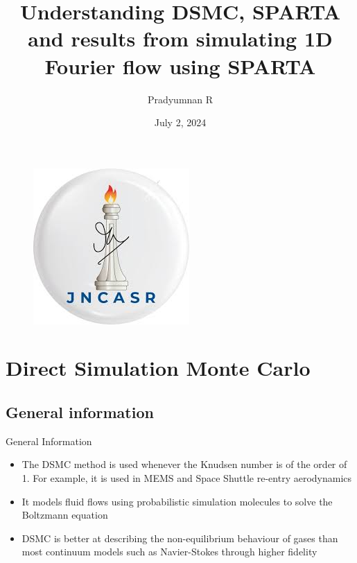 \documentclass{beamer}
\author{Pradyumnan R}
\title{Understanding DSMC, SPARTA and results from simulating 1D Fourier flow using SPARTA}
\institute{JNCASR}
\date{July 2, 2024}
\begin{document}
\renewcommand{\figurename}{Fig.} %

\begin{frame}
    \titlepage
    \begin{figure}[htpb]
        \begin{center}
            \includegraphics[width=0.2\linewidth]{Pictures/JNCASR_Logo.png}
        \end{center}
    \end{figure}
\end{frame}

\begin{frame}                       
    \tableofcontents[sectionstyle=show,subsectionstyle=show/shaded/hide,subsubsectionstyle=show/shaded/hide]
    
\end{frame}

\section{Direct Simulation Monte Carlo}

    \subsection{General information}

        \begin{frame}{General Information}
            \begin{itemize}
                \setlength\itemsep{0.25cm}
                
                \item<1->The DSMC method is used whenever the Knudsen number is of the order of 1. For example, it is used in MEMS and Space Shuttle re-entry aerodynamics
    
                \item<2->It models fluid flows using probabilistic simulation molecules to solve the Boltzmann equation
    
                \item<3-> DSMC is better at describing the non-equilibrium behaviour of gases than most continuum models such as Navier-Stokes through higher fidelity\cite{plimpton2019direct}
            \end{itemize}
        \end{frame}
\end{document}

